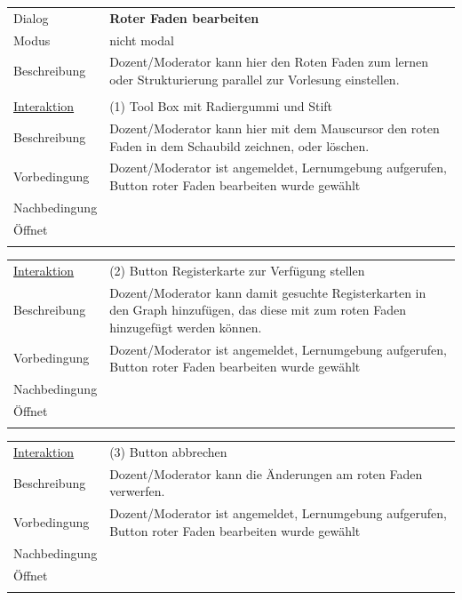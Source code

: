 \documentclass[12pt,a4paper]{article}
\begin{document}
{\begin{tabular}{l p{12cm}}
Dialog 	 		 & \textbf{Roter Faden bearbeiten} \\ 
Modus 			 & nicht modal\\ 
Beschreibung   	 & Dozent/Moderator kann hier den Roten Faden zum lernen oder Strukturierung parallel zur Vorlesung einstellen.\\\\

\underline{Interaktion} & (1) Tool Box mit Radiergummi und Stift \\ 
Beschreibung   	 		& Dozent/Moderator kann hier mit dem Mauscursor den roten Faden in dem Schaubild zeichnen, oder löschen. \\
Vorbedingung	 		& Dozent/Moderator ist angemeldet, Lernumgebung aufgerufen, Button roter Faden bearbeiten wurde gewählt\\
Nachbedingung	 		& \\
Öffnet			 		&  \\\\
\end{tabular}

\begin{tabular}{l p{12cm}}
\underline{Interaktion} & (2) Button Registerkarte zur Verfügung stellen  \\ 
Beschreibung   	 		& Dozent/Moderator kann damit gesuchte Registerkarten in den Graph hinzufügen, das diese mit zum roten Faden hinzugefügt werden können. \\
Vorbedingung	 		& Dozent/Moderator ist angemeldet, Lernumgebung aufgerufen, Button roter Faden bearbeiten wurde gewählt\\
Nachbedingung	 		& \\
Öffnet			 		& \\\\
\end{tabular}

\begin{tabular}{l p{12cm}}
\underline{Interaktion} & (3) Button abbrechen   \\ 
Beschreibung   	 		& Dozent/Moderator kann die Änderungen am roten Faden verwerfen.\\
Vorbedingung	 		& Dozent/Moderator ist angemeldet, Lernumgebung aufgerufen, Button roter Faden bearbeiten wurde gewählt\\
Nachbedingung	 		& \\
Öffnet			 		& \\\\
\end{tabular}


}
\end{document}
